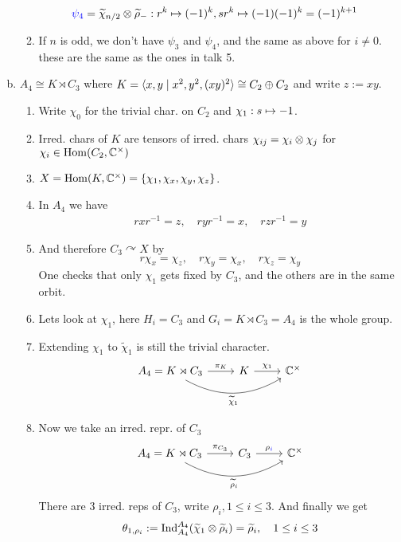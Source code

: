 \documentclass[a4paper]{article}
\begin{document}
\begin{exmp}
\begin{enumerate}[(a)]
\begin{enumerate}[1.]
\begin{align*}
                    \color{blue} \psi_{4} &= \widetilde \chi_{n/2} \otimes \widetilde \rho_{-}: r^{k} \mapsto (-1)^{k}, sr^{k} \mapsto (-1)(-1)^{k} = (-1)^{k+1}
                  \end{align*}
            \item If $n$ is odd, we don't have $\psi_{3}$ and $\psi_{4}$, and the same as above for $i \ne 0$. \color{blue} these are the same as the ones in talk 5.
          \end{enumerate}
    \item $A_{4} \cong K \rtimes C_{3}$ where $K = \langle x, y \mid x^{2}, y^{2}, (xy)^{2} \rangle \cong C_{2} \oplus C_{2}$ and write $z := xy$.
          \begin{enumerate}[1.]
            \item Write $\chi_{0}$ for the trivial char. on $C_{2}$ and $\chi_{1}: s \mapsto -1$.
            \item Irred. chars of $K$ are tensors of irred. chars $\chi_{ij} = \chi_{i} \otimes \chi_{j}$ for $\chi_{i} \in \operatorname{Hom}(C_{2}, \mathbb C^\times)$
            \item $X = \operatorname{Hom}(K, \mathbb C^\times) = \{\chi_{1}, \chi_{x}, \chi_{y}, \chi_{z}\}$.
            \item In $A_{4}$ we have
                  \begin{align*}
                    rxr^{-1} = z,\quad
                    ryr^{-1} = x,\quad
                    rzr^{-1} = y
                  \end{align*}

            \item And therefore $C_{3} \curvearrowright X$ by
                  \[r\chi_{x} = \chi_{z}, \quad r\chi_{y} = \chi_{x},\quad  r\chi_{z} = \chi_{y}\]
                  One checks that only $\chi_{1}$ gets fixed by $C_{3}$, and the others are in the same orbit.
            \item Lets look at $\chi_{1}$, here $H_{i} = C_{3}$ and $G_{i} = K \rtimes C_{3} = A_{4}$ is the whole group.
            \item Extending $\chi_{1}$ to $\tilde \chi_{1}$ is still the trivial character.
                  \[\begin{tikzcd}
A_4 = K \rtimes C_3 \arrow[r, "\pi_{K}"] \arrow[rr, "\tilde \chi_1"', bend right] & K \arrow[r, "\chi_1"] & \mathbb C\en
\end{tikzcd}\]
            \item Now we take an irred. repr. of $C_{3}$
                  \[\begin{tikzcd}
A_4 = K \rtimes C_3 \arrow[r, "\pi_{C_3}"] \arrow[rr, "\tilde \rho_i"', bend right] & C_3 \arrow[r, "\rho_{\color{blue} i}"] & \mathbb C\en
\end{tikzcd}\]
          There are 3 irred. reps of $C_{3}$, write $\rho_{i}, 1 \le i \le 3$. And finally we get
          \[\theta_{1, \rho_{i}}:= \operatorname{Ind}_{A_{4}}^{A_{4}}(\widetilde \chi_{1} \otimes \widetilde \rho_{i}) = \widetilde \rho_{i},\quad 1 \le i \le 3\]


\end{enumerate}
\end{enumerate}
\end{exmp}
\end{document}
